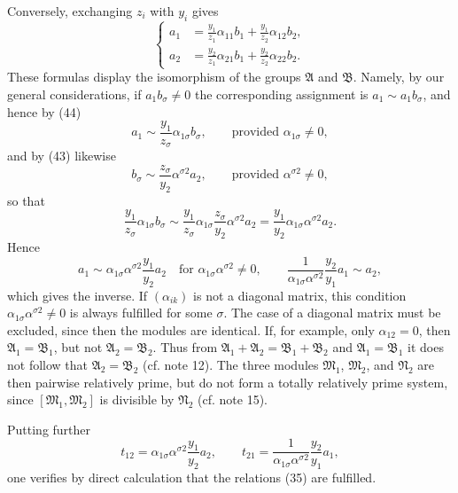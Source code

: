 \documentclass[11pt]{article}
\begin{document}
Conversely, exchanging $z_i$ with $y_i$ gives
\begin{equation}
\left\{
\begin{aligned}
 a_1&=\frac{y_1}{z_1}\alpha_{11}b_1+\frac{y_1}{z_2}\alpha_{12}b_2,\\
 a_2&=\frac{y_2}{z_1}\alpha_{21}b_1+\frac{y_2}{z_2}\alpha_{22}b_2.
\end{aligned}\right.
\tag{44}
\end{equation}
These formulas display the isomorphism of the groups $\mathfrak A$ and $\mathfrak B$. Namely, by our general considerations, if $a_1b_\sigma\ne0$ the corresponding assignment is $a_1\sim a_1b_\sigma$, and hence by (44)
\[
 a_1\sim\frac{y_1}{z_\sigma}\alpha_{1\sigma}b_\sigma,
 \qquad\text{provided }\alpha_{1\sigma}\ne0,
\]
and by (43) likewise
\[
 b_\sigma\sim\frac{z_\sigma}{y_2}\alpha^{\sigma2}a_2,
 \qquad\text{provided }\alpha^{\sigma2}\ne0,
\]
so that
\[
 \frac{y_1}{z_\sigma}\alpha_{1\sigma}b_\sigma
 \sim
 \frac{y_1}{z_\sigma}\alpha_{1\sigma}\frac{z_\sigma}{y_2}\alpha^{\sigma2}a_2
 =\frac{y_1}{y_2}\alpha_{1\sigma}\alpha^{\sigma2}a_2.
\]
Hence
\[
 a_1\sim\alpha_{1\sigma}\alpha^{\sigma2}\frac{y_1}{y_2}a_2
 \quad\text{for }\alpha_{1\sigma}\alpha^{\sigma2}\ne0,
 \qquad
 \frac{1}{\alpha_{1\sigma}\alpha^{\sigma2}}\frac{y_2}{y_1}a_1\sim a_2,
\]
which gives the inverse. If $(\alpha_{ik})$ is not a diagonal matrix, this condition $\alpha_{1\sigma}\alpha^{\sigma2}\ne0$ is always fulfilled for some $\sigma$. The case of a diagonal matrix must be excluded, since then the modules are identical. If, for example, only $\alpha_{12}=0$, then $\mathfrak A_1=\mathfrak B_1$, but not $\mathfrak A_2=\mathfrak B_2$. Thus from $\mathfrak A_1+\mathfrak A_2=\mathfrak B_1+\mathfrak B_2$ and $\mathfrak A_1=\mathfrak B_1$ it does not follow that $\mathfrak A_2=\mathfrak B_2$ (cf. note 12). The three modules $\mathfrak M_1$, $\mathfrak M_2$, and $\mathfrak N_2$ are then pairwise relatively prime, but do not form a totally relatively prime system, since $[\mathfrak M_1,
\mathfrak M_2]$ is divisible by $\mathfrak N_2$ (cf. note 15).

Putting further
\[
 t_{12}=\alpha_{1\sigma}\alpha^{\sigma2}\frac{y_1}{y_2}a_2,
 \qquad
 t_{21}=\frac{1}{\alpha_{1\sigma}\alpha^{\sigma2}}\frac{y_2}{y_1}a_1,
\]
one verifies by direct calculation that the relations (35) are fulfilled.
\end{document}
